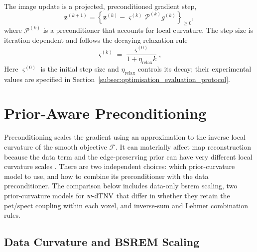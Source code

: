 The image update is a projected, preconditioned gradient step,
\begin{equation}
    \bm z^{(k+1)}
    =
    \left\{
    \bm z^{(k)}
    -
    \varsigma^{(k)} \mathcal{P}^{(k)} g^{(k)}
    \right\}_{\geq 0},
    \label{eq:optimisation_projected_update}
\end{equation}
where $\mathcal{P}^{(k)}$ is a preconditioner that accounts for local curvature. The step size is iteration dependent and follows the decaying relaxation rule
\begin{equation}
    \varsigma^{(k)}
    =
    \frac{\varsigma^{(0)}}{1+\eta_{\mathrm{relax}} k},
    \label{eq:optimisation_step_size}
\end{equation}
Here $\varsigma^{(0)}$ is the initial step size and $\eta_{\mathrm{relax}}$ controls its decay; their experimental values are specified in Section~\ref{subsec:optimisation_evaluation_protocol}.

\section{Prior-Aware Preconditioning}
\label{sec:optimisation_preconditioners}
\label{subsec:preconditioning}

Preconditioning scales the gradient using an approximation to the inverse local curvature of the smooth objective $\mathcal F$. It can materially affect \gls{map} reconstruction because the data term and the edge-preserving prior can have very different local curvature scales \cite{clinthornePreconditioningMethodsImproved1993,ahn_globally_2003,depierroFastEMlikeMethods2001,ehrhardtFastPETReconstruction2025a}. There are two independent choices: which prior-curvature model to use, and how to combine its preconditioner with the data preconditioner. The comparison below includes data-only \gls{bsrem} scaling, two prior-curvature models for $w\text{-}\mathrm{dTNV}$ that differ in whether they retain the \gls{pet}/\gls{spect} coupling within each voxel, and inverse-sum and Lehmer combination rules.

\subsection{Data Curvature and BSREM Scaling}
\label{subsec:optimisation_data_preconditioning}


